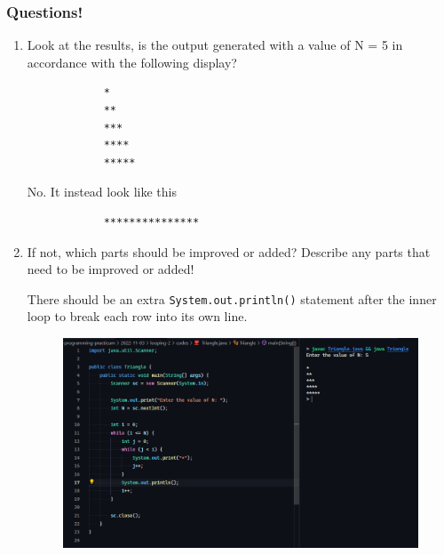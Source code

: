\documentclass[12pt,titlepage]{article}
\begin{document}
\pagebreak

\subsubsection*{Questions!}
\begin{enumerate}
    \item {
        Look at the results, is the output generated with a value of N = 5 in accordance with the following display?
        
        \begin{verbatim}
            *
            **
            ***
            ****
            *****
        \end{verbatim}

        No. It instead look like this

        \begin{verbatim}
            ***************
        \end{verbatim}
    }
    \item {
        If not, which parts should be improved or added? Describe any parts that need to be improved or added!

        There should be an extra \texttt{System.out.println()} statement after the inner loop to break each row into its own line.

        \begin{figure}[h]
            \centering
            \includegraphics[width=.8\textwidth]{./images/triangle-fix.png}
        \end{figure}
    }
\end{enumerate}
\end{document}
